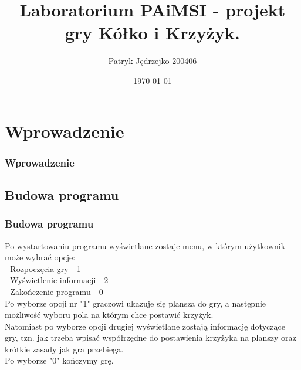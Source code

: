 \documentclass{beamer}
\title[Prezentacja]{Laboratorium PAiMSI - projekt gry Kółko i Krzyżyk.} %
\author{Patryk Jędrzejko 200406} %
\institute[Politechnika Wrocławska] %
{
Politechnika Wrocławska \\ %
\medskip
\textit{} %
}
\date{\today} %
\begin{document}
\begin{frame}
\titlepage %
\end{frame}

\begin{frame}
\frametitle{} %
\tableofcontents %
\end{frame}


\section{Wprowadzenie} %

\begin{frame}
\frametitle{Wprowadzenie}

\subsection{Budowa programu}
\frametitle{Budowa programu}
Po wystartowaniu programu wyświetlane zostaje menu, w którym użytkownik może wybrać opcje:
\\ - Rozpoczęcia gry - 1
\\ - Wyświetlenie informacji - 2
\\ - Zakończenie programu - 0
\\Po wyborze opcji nr "1" graczowi ukazuje się plansza do gry, a następnie możliwość wyboru pola na którym chce postawić krzyżyk.
\\Natomiast po wyborze opcji drugiej wyświetlane zostają informację dotyczące gry, tzn. jak trzeba wpisać współrzędne do postawienia krzyżyka na planszy oraz krótkie zasady jak gra przebiega.
\\Po wyborze "0" kończymy grę.
\end{frame}
\end{document}
